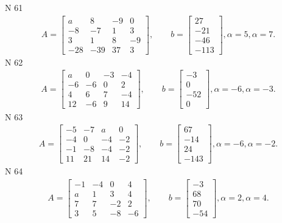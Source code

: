\documentclass[11pt]{report}
\begin{document}
N 61
\begin{align*}
 A = \left[\begin{matrix}a & 8 & -9 & 0\\-8 & -7 & 1 & 3\\3 & 1 & 8 & -9\\-28 & -39 & 37 & 3\end{matrix}\right],
    \qquad b = \left[\begin{matrix}27\\-21\\-46\\-113\end{matrix}\right], \alpha = 5, \alpha = 7. 
 \end{align*}
N 62
\begin{align*}
 A = \left[\begin{matrix}a & 0 & -3 & -4\\-6 & -6 & 0 & 2\\4 & 6 & 7 & -4\\12 & -6 & 9 & 14\end{matrix}\right],
    \qquad b = \left[\begin{matrix}-3\\0\\-52\\0\end{matrix}\right], \alpha = -6, \alpha = -3. 
 \end{align*}
N 63
\begin{align*}
 A = \left[\begin{matrix}-5 & -7 & a & 0\\-4 & 0 & -4 & -2\\-1 & -8 & -4 & -2\\11 & 21 & 14 & -2\end{matrix}\right],
    \qquad b = \left[\begin{matrix}67\\-14\\24\\-143\end{matrix}\right], \alpha = -6, \alpha = -2. 
 \end{align*}
N 64
\begin{align*}
 A = \left[\begin{matrix}-1 & -4 & 0 & 4\\a & 1 & 3 & 4\\7 & 7 & -2 & 2\\3 & 5 & -8 & -6\end{matrix}\right],
    \qquad b = \left[\begin{matrix}-3\\68\\70\\-54\end{matrix}\right], \alpha = 2, \alpha = 4. 
 \end{align*}
\end{document}
